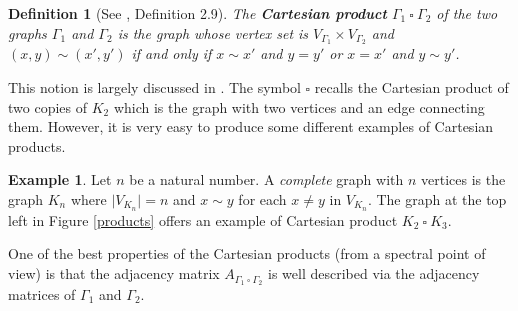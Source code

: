 \documentclass{amsart}
\newtheorem{defn}[theo]{Definition}
\theoremstyle{definition}
\newtheorem{example}[theo]{Example}
\numberwithin{equation}{section}
\begin{document}
\begin{defn}[See \cite{bddr}, Definition 2.9]\label{cproduct}
The \textbf{Cartesian product} $\Gamma_1  \ \square  \ \Gamma_2$ of the two graphs $\Gamma_1$ and $\Gamma_2$ is the graph whose vertex set is $V_{\Gamma_1} \times V_{\Gamma_2}$ and $(x,y) \sim (x',y')$ if and only if $x \sim x'$ and $y=y'$ or $x=x'$ and $y\sim y'$.
\end{defn}
This notion is largely discussed in \cite{handbook}. The symbol $\square$ recalls the Cartesian product of two copies of $K_2$ which is the graph with two vertices and an edge connecting them. However, it is very easy to produce some different examples of Cartesian products. 
\begin{example}
Let $n$ be a  natural number. A \textit{complete} graph with $n$ vertices is the graph $K_n$ where $\vert V_{K_n} \vert = n$ and $x \sim y$ for each $x \neq y$ in $V_{K_n}$. The graph at the top left in Figure \ref{products} offers an example of  Cartesian product $K_2  \ \square \  K_3$.
\end{example}
One of the best properties of the Cartesian products (from a spectral point of view) is that the adjacency matrix $A_{\Gamma_1  \ \square \  \Gamma_2}$ is well described via the adjacency matrices of $\Gamma_1$ and $\Gamma_2$. 
\end{document}
